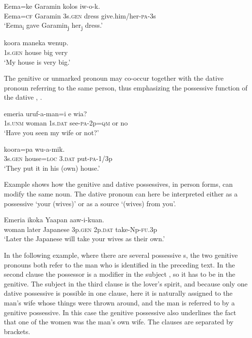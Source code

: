 \ea%
\label{ex:3:x590}
\gll Eema=ke Garamin  kolos iw-o-k. \\
Eema=\textsc{cf} Garamin 3s.\textsc{gen} dress give.him/her-\textsc{pa}-3s\\
\glt`Eema\textsubscript{i} gave Garamin\textsubscript{j} her\textsubscript{j} dress.'
\z

\ea%
\label{ex:3:x591}
\gll {} koora maneka wenup. \\
1s.\textsc{gen} house big very\\
\glt`My house is very big.'
\z

The genitive or unmarked pronoun may co-occur together with the dative pronoun referring to the same person, thus emphasizing the possessive function of the dative , .

\ea%
\label{ex:3:x1863}
\gll {} emeria  uruf-a-man=i e wia? \\
1s.\textsc{unm} woman 1s.\textsc{dat} see-\textsc{pa}-2p=\textsc{qm} or no\\
\glt`Have you seen my wife or not?'
\z

\ea%
\label{ex:3:x593}
\gll {} koora=pa  wu-a-mik. \\
3s.\textsc{gen} house=\textsc{loc} 3.\textsc{dat} put-\textsc{pa}-1/3p\\
\glt`They put it in his (own) house.'
\z

Example  shows how the genitive and dative possessives, in  person forms, can modify the same noun. The dative pronoun can here be interpreted either as a possessive `your (wives)' or as a source `(wives) from you'.

\ea%
\label{ex:3:x594}
\gll Emeria ikoka Yaapan   aaw-i-kuan. \\
woman later Japanese 3p.\textsc{gen} 2p.\textsc{dat} take-Np-\textsc{fu}.3p\\
\glt`Later the Japanese will take your wives as their own.'
\z

In the following example, where there are several possessive s, the two genitive pronouns both refer to the man who is identified in the preceding text. In the second clause the possessor is a modifier in the subject , so it has to be in the genitive. The subject in the third clause is the lover's spirit, and because only one dative possessive is possible in one clause, here it is naturally assigned to the man's wife whose things were thrown around, and the man is referred to by a genitive possessive. In this case the genitive possessive also underlines the fact that one of the women was the man's own wife. The clauses are separated by brackets.

